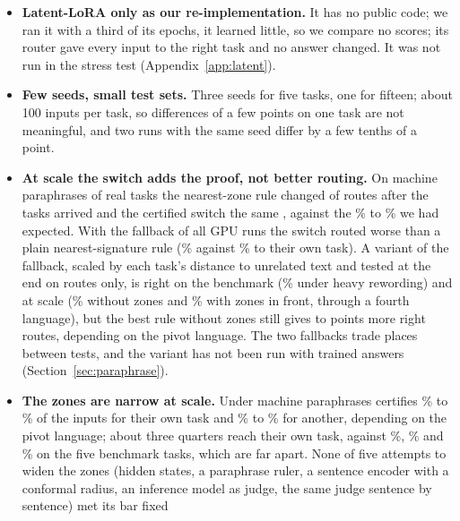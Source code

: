 \begin{itemize}
  without its sentiment tasks. The first choice was not varied, the second only for routes
  (Section~\ref{sec:background}).
  \item \textbf{Latent-LoRA only as our re-implementation.} It has no public code; we ran it with a third
  of its epochs, it learned little, so we compare no scores; its router gave every input to the right task and no answer changed. It was not run in the stress test
  (Appendix~\ref{app:latent}).
  \item \textbf{Few seeds, small test sets.} Three seeds for five tasks, one for fifteen; about 100
  inputs per task, so differences of a few points on one task are not meaningful, and two runs with the
  same seed differ by a few tenths of a point.
  \item \textbf{At scale the switch adds the proof, not better routing.} On machine paraphrases of
  \WidenTasksEval{} real tasks the nearest-zone rule changed \RerouteNearNChanged{} of
  \RerouteInputs{} routes after the tasks arrived and the certified switch the same
  \RerouteCertNChanged{}, against the \RerouteExpectNearLow{}\% to \RerouteExpectNearHigh{}\% we had
  expected. With the fallback of all GPU runs the switch routed worse than a plain nearest-signature rule
  (\RerouteCertOwnEnd{}\% against \RerouteSigOwnEnd{}\% to their own task). A variant of the fallback,
  scaled by each task's distance to unrelated text and tested at the end on routes only, is right on the
  benchmark (\RerouteBgHeavyFive{}\% under heavy rewording) and at scale (\RerouteBgItOwn{}\% without
  zones and \RerouteCertFourItOwn{}\% with zones in front, through a fourth language), but the best rule
  without zones still gives \RerouteZonesCost{} to \RerouteZonesCostEs{} points more right routes, depending on the pivot language. The two fallbacks trade places between
  tests, and the variant has not been run with trained answers (Section~\ref{sec:paraphrase}).
  \item \textbf{The zones are narrow at scale.} Under machine paraphrases \cert{} certifies \WidenRefTfivePLow{}\% to \WidenRefTfivePHigh{}\% of the
  inputs for their own task and \WidenRefTfiveMLow{}\% to \WidenRefTfiveMHigh{}\% for another, depending
  on the pivot language; about three quarters reach their own task, against \FiveCertRightLight{}\%,
  \FiveCertRightMedium{}\% and \FiveCertRightHeavy{}\% on the five benchmark tasks, which are far apart.
  None of five attempts to widen the zones (hidden states, a paraphrase ruler, a sentence encoder with a
  conformal radius, an inference model as judge, the same judge sentence by sentence) met its bar fixed

\end{itemize}
